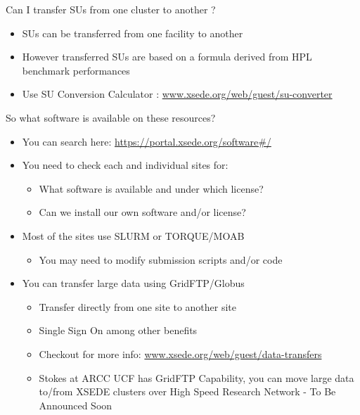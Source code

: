 \documentclass[compress,10pt]{beamer}
\begin{document}
\begin{frame}{Can I transfer SUs from one cluster to another ?}
\begin{itemize}
\item SUs can be transferred from one facility to another
\item However transferred SUs are based on a formula derived from HPL benchmark performances
\item Use SU Conversion Calculator : \url{www.xsede.org/web/guest/su-converter}

\end{itemize}

\end{frame}

\begin{frame}{So what software is available on these resources?}

\begin{itemize}
\pause
\item You can search here: \url{https://portal.xsede.org/software\#/} \newline [Demo] 
\pause
\item You need to check each and individual sites for:
\begin{itemize}
 \item What software is available and under which license?
 \item Can we install our own software and/or license?
\end{itemize}

\pause
\item Most of the sites use SLURM or TORQUE/MOAB
\begin{itemize}
 \item You may need to modify submission scripts and/or code
\end{itemize}

\pause
\item You can transfer large data using GridFTP/Globus
\begin{itemize}
 \item Transfer directly from one site to another site
 \item Single Sign On among other benefits
 \item Checkout for more info: \url{www.xsede.org/web/guest/data-transfers}
\pause
\item Stokes at ARCC UCF has GridFTP Capability, you can move large data to/from XSEDE clusters over High Speed Research Network - To Be Announced Soon
\end{itemize}

\end{itemize}
\end{frame}
\end{document}
